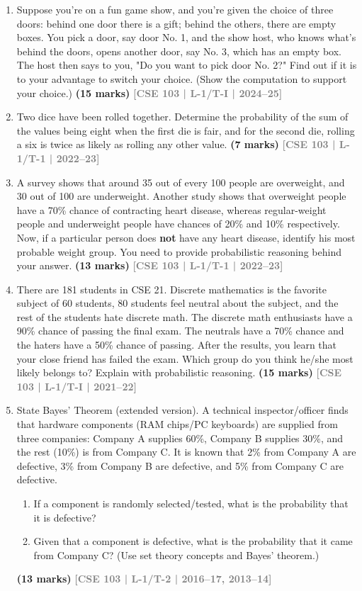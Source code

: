 \documentclass[12pt,a3paper]{article}
\newcommand{\yr}[1]{\hfill\textcolor{gray}{\small\textbf{[#1]}}}
\newcommand{\mk}[1]{\textcolor{orange!70!black}{\small\textbf{(#1 marks)}}}
\begin{document}
\begin{enumerate}

\item Suppose you're on a fun game show, and you're given the choice of three doors: behind one door there is a gift; behind the others, there are empty boxes. You pick a door, say door No. 1, and the show host, who knows what's behind the doors, opens another door, say No. 3, which has an empty box. The host then says to you, "Do you want to pick door No. 2?" Find out if it is to your advantage to switch your choice. (Show the computation to support your choice.)
\mk{15} \yr{CSE 103 | L-1/T-I | 2024--25}

\item Two dice have been rolled together. Determine the probability of the sum of the values being eight when the first die is fair, and for the second die, rolling a six is twice as likely as rolling any other value.
\mk{7} \yr{CSE 103 | L-1/T-1 | 2022--23}

\item A survey shows that around 35 out of every 100 people are overweight, and 30 out of 100 are underweight. Another study shows that overweight people have a 70\% chance of contracting heart disease, whereas regular-weight people and underweight people have chances of 20\% and 10\% respectively. Now, if a particular person does \textbf{not} have any heart disease, identify his most probable weight group. You need to provide probabilistic reasoning behind your answer.
\mk{13} \yr{CSE 103 | L-1/T-1 | 2022--23}

\item There are 181 students in CSE 21. Discrete mathematics is the favorite subject of 60 students, 80 students feel neutral about the subject, and the rest of the students hate discrete math. The discrete math enthusiasts have a 90\% chance of passing the final exam. The neutrals have a 70\% chance and the haters have a 50\% chance of passing. After the results, you learn that your close friend has failed the exam. Which group do you think he/she most likely belongs to? Explain with probabilistic reasoning.
\mk{15} \yr{CSE 103 | L-1/T-I | 2021--22}

\item State Bayes' Theorem (extended version). A technical inspector/officer finds that hardware components (RAM chips/PC keyboards) are supplied from three companies: Company A supplies 60\%, Company B supplies 30\%, and the rest (10\%) is from Company C. It is known that 2\% from Company A are defective, 3\% from Company B are defective, and 5\% from Company C are defective.
\begin{enumerate}
  \item If a component is randomly selected/tested, what is the probability that it is defective?
  \item Given that a component is defective, what is the probability that it came from Company C? (Use set theory concepts and Bayes' theorem.)
\end{enumerate}
\mk{13} \yr{CSE 103 | L-1/T-2 | 2016--17, 2013--14}


\end{enumerate}
\end{document}
